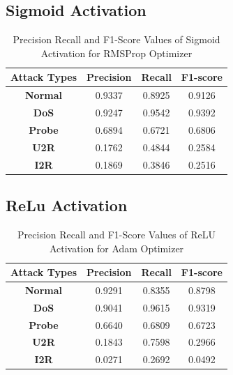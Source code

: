 \documentclass[12pt, a4paper]{report}
\begin{document}
\begin{appendices}
   \subsection{Sigmoid Activation}
   \begin{table}[h]
	\centering
	\captionsetup{justification=centering,margin=2cm}
	\begin{tabular}{|c|c|c|c|}
	\hline
	\textbf{Attack Types} & \textbf{Precision} & \textbf{Recall} & \textbf{F1-score} \\ \hline
	\textbf{Normal}       & 0.9337             & 0.8925          & 0.9126            \\ \hline
	\textbf{DoS}          & 0.9247             & 0.9542          & 0.9392            \\ \hline
	\textbf{Probe}        & 0.6894             & 0.6721          & 0.6806            \\ \hline
	\textbf{U2R}          & 0.1762             & 0.4844          & 0.2584            \\ \hline
	\textbf{I2R}          & 0.1869             & 0.3846          & 0.2516            \\ \hline
	\end{tabular}
	\caption{Precision Recall and F1-Score Values of Sigmoid Activation for RMSProp Optimizer}
	\label{classification sigmoid adam tflearn}
	\end{table} 
	
	\subsection{ReLu Activation}
   \begin{table}[h]
	\centering
	\captionsetup{justification=centering,margin=2cm}
	\begin{tabular}{|c|c|c|c|}
	\hline
	\textbf{Attack Types} & \textbf{Precision} & \textbf{Recall} & \textbf{F1-score} \\ \hline
	\textbf{Normal}       & 0.9291             & 0.8355          & 0.8798            \\ \hline
	\textbf{DoS}          & 0.9041             & 0.9615          & 0.9319            \\ \hline
	\textbf{Probe}        & 0.6640             & 0.6809          & 0.6723            \\ \hline
	\textbf{U2R}          & 0.1843             & 0.7598          & 0.2966            \\ \hline
	\textbf{I2R}          & 0.0271             & 0.2692          & 0.0492            \\ \hline
	\end{tabular}
	\caption{Precision Recall and F1-Score Values of ReLU Activation for Adam Optimizer}
	\label{classification relu adam tflearn}
	\end{table} 


\end{appendices}
\end{document}
